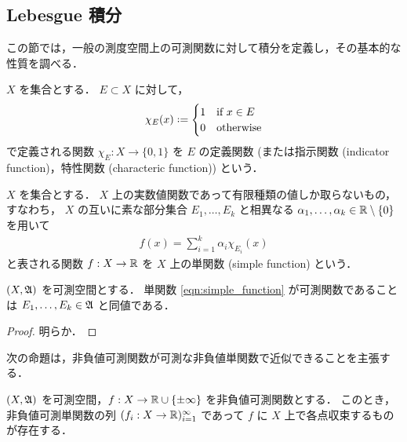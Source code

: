 \subsection{Lebesgue 積分}\label{sec:integration}

この節では，一般の測度空間上の可測関数に対して積分を定義し，その基本的な性質を調べる．

\begin{definition}
    $X$ を集合とする．
    $E\subset X$ に対して，
    \begin{align*}
        \chi_E(x)\defeq\begin{cases}
            1&\text{if $x\in E$}\\
            0&\text{otherwise}
        \end{cases}
    \end{align*}
    で定義される関数 $\chi_E:X\to\{0,1\}$ を $E$ の定義関数
    (または指示関数 (indicator function)，特性関数 (characteric function)) という．
\end{definition}

\begin{definition}
    $X$ を集合とする．
    $X$ 上の実数値関数であって有限種類の値しか取らないもの，すなわち，
    $X$ の互いに素な部分集合 $E_1,\ldots,E_k$ と相異なる $\alpha_1,\ldots,\alpha_k\in\mathbb{R}\setminus\{0\}$ を用いて
    \begin{align}
        f(x)=\sum_{i=1}^k\alpha_i\chi_{E_i}(x)
        \label{eqn:simple_function}
    \end{align}
    と表される関数 $f:X\to\mathbb{R}$ を $X$ 上の単関数 (simple function) という．
\end{definition}

\begin{proposition}\label{prop:measurability_of_simple_function}
    $(X,\mathfrak{A})$ を可測空間とする．
    単関数 \eqref{eqn:simple_function} が可測関数であることは $E_1,\ldots,E_k\in\mathfrak{A}$ と同値である．
\end{proposition}

\begin{proof}
    明らか．
\end{proof}

次の命題は，非負値可測関数が可測な非負値単関数で近似できることを主張する．

\begin{proposition}\label{prop:approx_measurable_by_simple}
    $(X,\mathfrak{A})$ を可測空間，$f:X\to\mathbb{R}\cup\{\pm\infty\}$ を非負値可測関数とする．
    このとき，非負値可測単関数の列 $(f_i:X\to\mathbb{R})_{i=1}^\infty$ であって $f$ に $X$ 上で各点収束するものが存在する．
\end{proposition}

